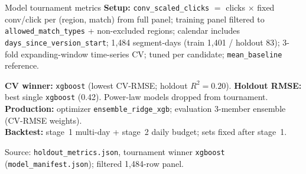 \documentclass[11pt]{beamer}
\begin{document}
\begin{frame}{Model tournament metrics}
  \scriptsize
  \textbf{Setup:} \texttt{conv\_scaled\_clicks} $=$ clicks $\times$ fixed conv/click per (region, match) from full panel;
  training panel filtered to \texttt{allowed\_match\_types} + non-excluded regions;
  calendar includes \texttt{days\_since\_version\_start}; 1{,}484 segment-days (train 1{,}401 / holdout 83);
  3-fold expanding-window time-series CV; tuned per candidate; \texttt{mean\_baseline} reference.

  \vspace{0.15em}
  \centering
  \setlength{\tabcolsep}{4pt}
  \renewcommand{\arraystretch}{0.9}

  \vspace{0.2em}
  \raggedright
  \textbf{CV winner:} \texttt{xgboost} (lowest CV-RMSE; holdout $R^2{=}0.20$).
  \textbf{Holdout RMSE:} best single \texttt{xgboost} (0.42). Power-law models dropped from tournament.
  \textbf{Production:} optimizer \texttt{ensemble\_ridge\_xgb}; evaluation 3-member ensemble (CV-RMSE weights).\\
  \textbf{Backtest:} stage~1 multi-day + stage~2 daily budget; sets fixed after stage~1.

  {\tiny Source: \texttt{holdout\_metrics.json}, tournament winner \texttt{xgboost} (\texttt{model\_manifest.json}); filtered 1{,}484-row panel.}
\end{frame}
\end{document}
